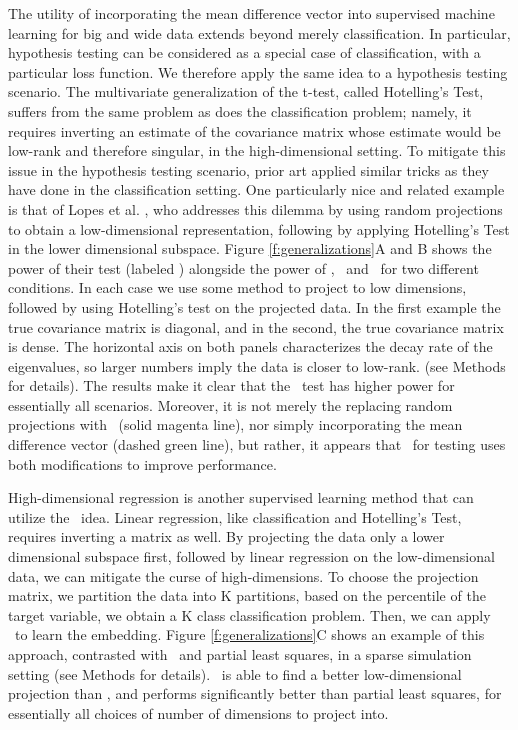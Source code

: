 \documentclass[10pt]{article}
\begin{document}
The utility of incorporating the mean difference vector into supervised machine learning for big and wide data extends beyond merely classification.  In particular, hypothesis testing can be considered as a special case of classification, with a particular loss function. We therefore apply the same idea to a hypothesis testing scenario.  The multivariate generalization of the t-test, called Hotelling's Test, suffers from the same problem as does the classification problem; namely, it requires inverting an estimate of the covariance matrix whose estimate would be low-rank and therefore singular, in the high-dimensional setting. To mitigate this issue in the hypothesis testing scenario, prior art applied similar tricks as they have done in the classification setting. One particularly nice and related example is that of  Lopes et al. \cite{Lopes2011a}, who addresses this dilemma by using random projections to obtain a low-dimensional representation, following by applying Hotelling's Test in the lower dimensional subspace.  Figure \ref{f:generalizations}{\color{magenta}A} and {\color{magenta}B} shows the power of their test (labeled ) alongside the power of \Pca, \Lol~and \Lal~for two different conditions.  
In each case we use some method to project to low dimensions, followed by using Hotelling's test on the projected data.
In the first  example the true covariance matrix is diagonal, and in the second, the true covariance matrix is dense.  
The horizontal axis on both panels characterizes the decay rate of the eigenvalues, so larger numbers imply the data is closer to low-rank.  
(see Methods for details).  The results make it clear that the \Lol~test has higher power for essentially all scenarios.  Moreover, it is not merely the replacing random projections with \Pca~(solid magenta line), nor simply incorporating the mean difference vector (dashed green line), but rather, it appears that \Lol~for testing uses both modifications to improve performance.

High-dimensional  regression is another supervised learning method that can utilize the \Lol~idea. Linear regression, like classification and Hotelling's Test, requires inverting a  matrix as well.  By projecting the data only a lower dimensional subspace first, followed by linear regression on the low-dimensional data, we can mitigate the curse of high-dimensions.  To choose the projection matrix, we partition the data into K partitions, based on the percentile of the target variable, we obtain a K class classification problem.  Then, we can apply \Lol~to learn the embedding.  Figure \ref{f:generalizations}{\color{magenta}C} shows an example of this approach, contrasted with \Lasso~and partial least squares, in a sparse simulation setting (see Methods for details). \Lol~is able to find a better low-dimensional projection than \Lasso, and performs significantly better than partial least squares, for essentially all choices of number of dimensions to project into.
\end{document}
